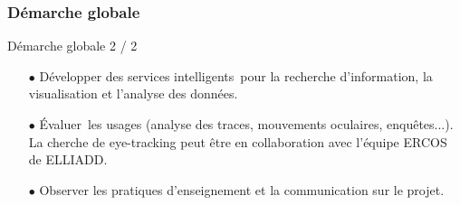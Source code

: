 \documentclass[xcolor=dvipsnames]{beamer}
\begin{document}
\begin{frame}[fragile]
\frametitle{Démarche globale}
\begin{block}{Démarche globale 2 / 2}
	\begin{itemize}
		\item[$\bullet$]Développer des services intelligents pour la recherche d'information, la visualisation et l’analyse des données.
		\item[$\bullet$]Évaluer les usages (analyse des traces, mouvements oculaires, enquêtes...). La cherche de eye-tracking peut être en collaboration avec l’équipe ERCOS de ELLIADD.
		\item[$\bullet$]Observer les pratiques d'enseignement et la communication sur le projet.
	\end{itemize}
\end{block}
\vspace{2cm}
\end{frame}
\end{document}
